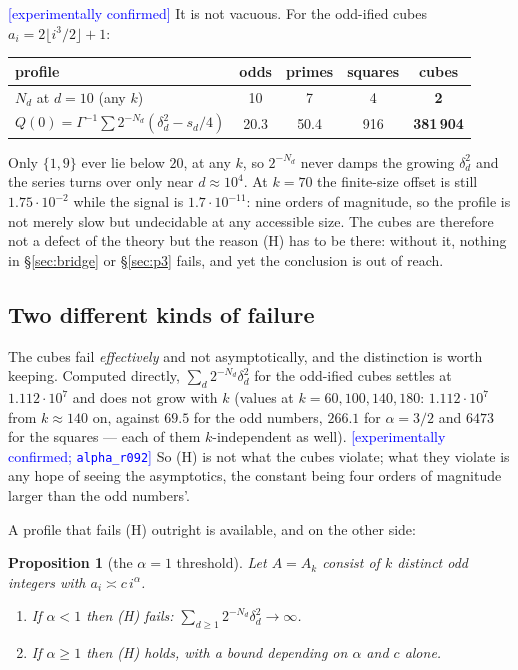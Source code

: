 \documentclass[11pt,a4paper]{article}
\theoremstyle{plain}
\newtheorem{proposition}[theorem]{Proposition}
\theoremstyle{definition}
\theoremstyle{remark}
\newcommand{\STATUS}[1]{\textcolor{blue}{\textsf{[#1]}}}
\begin{document}
\STATUS{experimentally confirmed} It is not vacuous. For the odd-ified cubes
$a_i=2\lfloor i^3/2\rfloor+1$:

\begin{center}
\begin{tabular}{lcccc}
\toprule
profile & odds & primes & squares & cubes\\
\midrule
$N_d$ at $d=10$ (any $k$) & 10 & 7 & 4 & \textbf{2}\\
$Q(0)=\Gamma^{-1}\sum2^{-N_d}(\delta_d^2-s_d/4)$ & 20.3 & 50.4 & 916 & \textbf{381\,904}\\
\bottomrule
\end{tabular}
\end{center}

\noindent
Only $\{1,9\}$ ever lie below $20$, at any $k$, so $2^{-N_d}$ never damps the growing
$\delta_d^2$ and the series turns over only near $d\approx10^4$. At $k=70$ the finite-size
offset is still $1.75\cdot10^{-2}$ while the signal is $1.7\cdot10^{-11}$: nine orders of
magnitude, so the profile is not merely slow but undecidable at any accessible size.
The cubes are therefore not a defect of the theory but the reason \textup{(H)} has to be
there: without it, nothing in \S\ref{sec:bridge} or \S\ref{sec:p3} fails, and yet the
conclusion is out of reach.

\subsection{Two different kinds of failure}\label{sec:twofailures}

The cubes fail \emph{effectively} and not asymptotically, and the distinction is worth
keeping. Computed directly, $\sum_d2^{-N_d}\delta_d^2$ for the odd-ified cubes settles at
$1.112\cdot10^{7}$ and does not grow with $k$ (values at $k=60,100,140,180$:
$1.112\cdot10^{7}$ from $k\approx140$ on, against $69.5$ for the odd numbers, $266.1$ for
$\alpha=3/2$ and $6473$ for the squares --- each of them $k$-independent as well).
\STATUS{experimentally confirmed; \texttt{alpha\_r092}} So \textup{(H)} is not what the cubes
violate; what they violate is any hope of seeing the asymptotics, the constant being four
orders of magnitude larger than the odd numbers'.

A profile that fails \textup{(H)} outright is available, and on the other side:

\begin{proposition}[the $\alpha=1$ threshold]\label{prop:alphalb}
Let $A=A_k$ consist of $k$ distinct odd integers with $a_i\asymp c\,i^{\alpha}$.
\begin{enumerate}
\item[(i)] If $\alpha<1$ then \textup{(H)} fails: $\sum_{d\ge1}2^{-N_d}\delta_d^{2}\to\infty$.
\item[(ii)] If $\alpha\ge1$ then \textup{(H)} holds, with a bound depending on $\alpha$ and $c$
      alone.
\end{enumerate}
\end{proposition}
\end{document}
